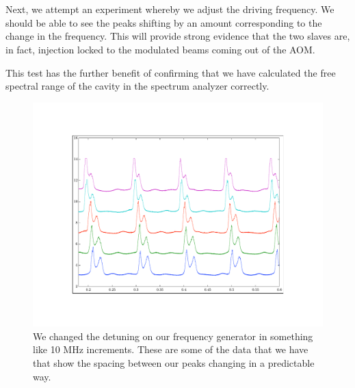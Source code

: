 \section{}

Next, we attempt an experiment whereby we adjust the driving frequency. We should be able to see the peaks shifting by an amount corresponding to the change in the frequency. This will provide strong evidence that the two slaves are, in fact, injection locked to the modulated beams coming out of the AOM. 

This test has the further benefit of confirming that we have calculated the free spectral range of the cavity in the spectrum analyzer correctly. 


 
\begin{figure}
    \centerline{\includegraphics{sampleOffsetData}}
    \caption[]{\label{fig:typicaldata}
    We changed the detuning on our frequency generator in something like 10 MHz increments. These are some of the data that we have that show the spacing between our peaks changing in a predictable way.}
\end{figure}
